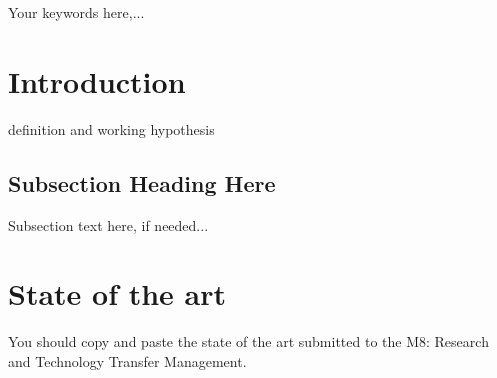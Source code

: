 \documentclass[journal,onecolumn]{IEEEtran}
\begin{document}







\maketitle

\begin{abstract}
Short work summary (around 100 words).
\end{abstract}

\begin{IEEEkeywords}
Your keywords here,...
\end{IEEEkeywords}


%
\IEEEpeerreviewmaketitle



\section{Introduction}

  definition and working hypothesis

\subsection{Subsection Heading Here}
Subsection text here, if needed...


\section{State of the art}
You should copy and paste the state of the art submitted to the M8: Research and Technology Transfer Management.
\end{document}

